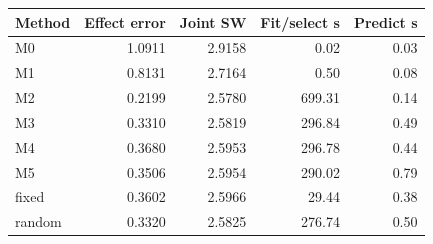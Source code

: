 \begin{tabular}{lrrrr}
\toprule
Method & Effect error & Joint SW & Fit/select s & Predict s \\
\midrule
M0 & 1.0911 & 2.9158 & 0.02 & 0.03 \\
M1 & 0.8131 & 2.7164 & 0.50 & 0.08 \\
M2 & 0.2199 & 2.5780 & 699.31 & 0.14 \\
M3 & 0.3310 & 2.5819 & 296.84 & 0.49 \\
M4 & 0.3680 & 2.5953 & 296.78 & 0.44 \\
M5 & 0.3506 & 2.5954 & 290.02 & 0.79 \\
fixed & 0.3602 & 2.5966 & 29.44 & 0.38 \\
random & 0.3320 & 2.5825 & 276.74 & 0.50 \\
\bottomrule
\end{tabular}
